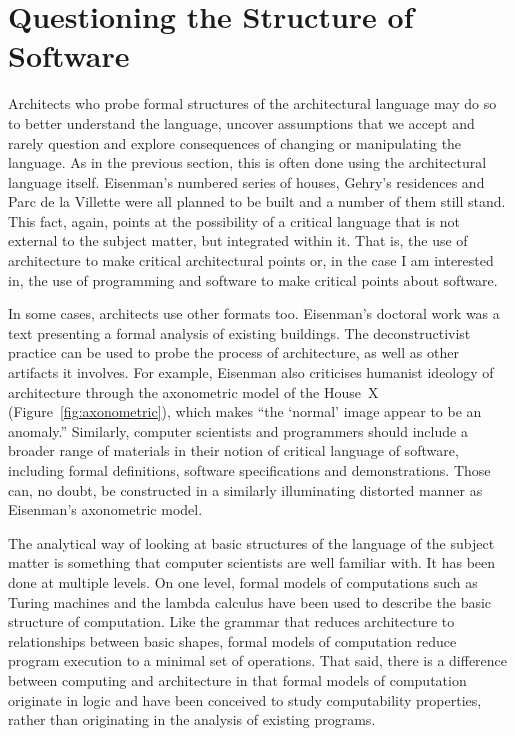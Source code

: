 \section{Questioning the Structure of Software}
Architects who probe formal structures of the architectural language may do so to better understand
the language, uncover assumptions that we accept and rarely question and explore consequences of
changing or manipulating the language. As in the previous section, this is often done using the
architectural language itself. Eisenman's numbered series of houses, Gehry's residences and Parc
de la Villette were all planned to be built and a number of them still stand.
This fact, again, points at the possibility of a critical language that is not external to the subject
matter, but integrated within it. That is, the use of architecture to make critical architectural points
or, in the case I am interested in, the use of programming and software to make critical points about
software.

In some cases, architects use other formats too. Eisenman's doctoral work was a text presenting
a formal analysis of existing buildings. The deconstructivist practice can be used to probe the
process of architecture, as well as other artifacts it involves. For example,
Eisenman also criticises humanist ideology of architecture through the
axonometric model of the House~X (Figure~\ref{fig:axonometric}), which makes
``the `normal' image appear to be an anomaly.''
Similarly, computer scientists and programmers should include a broader range of materials in
their notion of critical language of software, including formal definitions, software
specifications and demonstrations. Those can, no doubt, be constructed in a similarly
illuminating distorted manner as Eisenman's axonometric model.

The analytical way of looking at basic structures of the language of the subject matter is something
that computer scientists are well familiar with. It has been done at multiple levels. On one
level, formal models of computations such as Turing machines and the lambda calculus have been
used to describe the basic structure of computation. Like the grammar that reduces architecture
to relationships between basic shapes, formal models of computation reduce program execution to
a minimal set of operations. That said, there is a difference between computing and architecture
in that formal models of computation originate in logic and have been conceived to study
computability properties, rather than originating in the analysis of existing programs.

